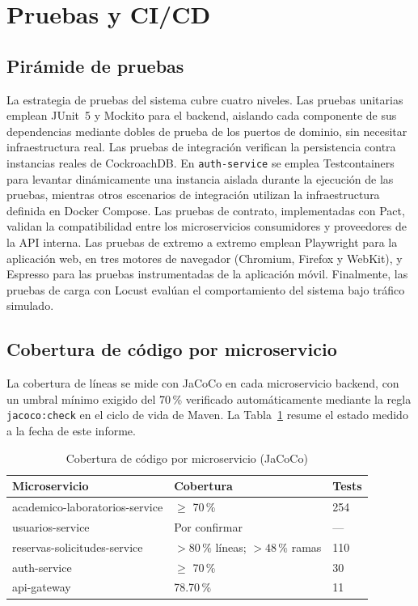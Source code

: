 \section{Pruebas y CI/CD}
\label{sec:pruebas-cicd}

\subsection{Pirámide de pruebas}

La estrategia de pruebas del sistema cubre cuatro niveles. Las pruebas
unitarias emplean JUnit~5 y Mockito para el backend, aislando cada
componente de sus dependencias mediante dobles de prueba de los puertos
de dominio, sin necesitar infraestructura real. Las pruebas de integración verifican la persistencia contra instancias reales de
CockroachDB. En \texttt{auth-service} se emplea Testcontainers para levantar
dinámicamente una instancia aislada durante la ejecución de las pruebas,
mientras otros escenarios de integración utilizan la infraestructura definida
en Docker Compose. Las pruebas de contrato,
implementadas con Pact, validan la compatibilidad entre los
microservicios consumidores y proveedores de la API interna. Las
pruebas de extremo a extremo emplean Playwright para la aplicación web,
en tres motores de navegador (Chromium, Firefox y WebKit), y Espresso
para las pruebas instrumentadas de la aplicación móvil. Finalmente, las
pruebas de carga con Locust evalúan el comportamiento del sistema bajo
tráfico simulado.

\subsection{Cobertura de código por microservicio}

La cobertura de líneas se mide con JaCoCo en cada microservicio backend,
con un umbral mínimo exigido del 70\,\% verificado automáticamente
mediante la regla \texttt{jacoco:check} en el ciclo de vida de Maven.
La Tabla~\ref{tab:cobertura} resume el estado medido a la fecha de este
informe.

\begin{table}[htbp]
\centering
\caption{Cobertura de código por microservicio (JaCoCo)}
\label{tab:cobertura}
\begin{tabular}{lll}
\toprule
Microservicio & Cobertura & Tests \\
\midrule
academico-laboratorios-service & $\geq$ 70\,\% & 254 \\
usuarios-service & Por confirmar & --- \\
reservas-solicitudes-service & $>80\,\%$ líneas; $>48\,\%$ ramas & 110 \\
auth-service & $\geq$ 70\,\% & 30 \\
api-gateway & 78.70\,\% & 11 \\
\bottomrule
\end{tabular}
\end{table}


